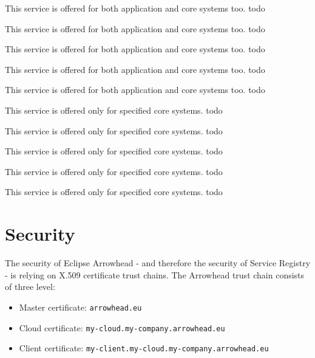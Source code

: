 \documentclass[a4paper]{arrowhead}
\begin{document}
This service is offered for both application and core systems too.
\color{red}todo\color{black}

This service is offered for both application and core systems too.
\color{red}todo\color{black}

This service is offered for both application and core systems too.
\color{red}todo\color{black}

This service is offered for both application and core systems too.
\color{red}todo\color{black}

This service is offered for both application and core systems too.
\color{red}todo\color{black}

This service is offered only for specified core systems.
\color{red}todo\color{black}

This service is offered only for specified core systems.
\color{red}todo\color{black}

This service is offered only for specified core systems.
\color{red}todo\color{black}

This service is offered only for specified core systems.
\color{red}todo\color{black}

This service is offered only for specified core systems.
\color{red}todo\color{black}

\newpage

\section{Security}
\label{sec:security}

The security of Eclipse Arrowhead - and therefore the security of Service Registry  - is relying on X.509 certificate trust chains. The Arrowhead trust chain consists of three level:
\begin{itemize}
    \item Master certificate: \texttt{arrowhead.eu}
    \item Cloud certificate: \texttt {my-cloud.my-company.arrowhead.eu}
    \item Client certificate: \texttt{my-client.my-cloud.my-company.arrowhead.eu}
\end{itemize}
\end{document}
